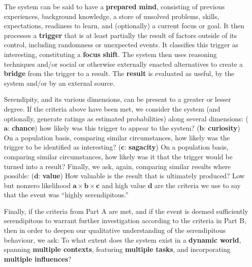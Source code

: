 \begin{description}[itemsep=4pt]
\item[{(\textbf{A - Definitional characteristics})}] {The system can
  be said to have a {\textbf{prepared mind}}, consisting of previous
  experiences, background knowledge, a store of unsolved problems,
  skills, expectations, readiness to learn, and (optionally) a current
  focus or goal.  It then processes a {\textbf{trigger}} that is at
  least partially the result of factors outside of its control,
  including randomness or unexpected events.  It classifies this
  trigger as interesting, constituting a {\textbf{focus shift}}.  The
  system then uses reasoning techniques and/or social or otherwise
  externally enacted alternatives to create a {\textbf{bridge}} from
  the trigger to a result.  The {\textbf{result}} is evaluated as
  useful, by the system and/or by an external source.}
\item[{(\textbf{B - Dimensions})}] {Serendipity, and its various
  dimensions, can be present to a greater or lesser degree.  If the
  criteria above have been met, we consider the system (and
  optionally, generate ratings as estimated probabilities) along
  several dimensions:
%
{($\mathbf{a}$: \textbf{chance})} how likely was this trigger to appear to
  the system?
%
{($\mathbf{b}$: \textbf{curiosity})} On a population basis, comparing
similar circumstances, how likely was the trigger to be identified as
interesting?
%
{($\mathbf{c}$: \textbf{sagacity})} On a population basis, comparing
similar circumstances, how likely was it that the trigger would be
turned into a result?
%
Finally, we ask, again, comparing similar results where possible:
{($\mathbf{d}$: \textbf{value})} How valuable is the result that
is ultimately produced?}
%
{Low but nonzero likelihood $\mathbf{a}\times\mathbf{b}\times\mathbf{c}$ 
 and high value $\mathbf{d}$ are the criteria we use to say that the event was ``highly serendipitous.''}

\item[{(\textbf{C - Factors})}] {Finally, if the criteria from Part A
  are met, and if the event is deemed sufficiently serendipitous to
  warrant further investigation according to the criteria in Part B,
  then in order to deepen our qualitative understanding of the
  serendipitous behaviour, we ask: To what extent does the system
  exist in a {\textbf{dynamic world}}, spanning {\textbf{multiple
      contexts}}, featuring {\textbf{multiple tasks}}, and
  incorporating {\textbf{multiple influences}}?}
\end{description}

